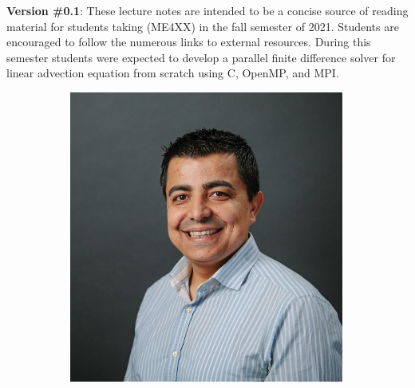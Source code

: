 {\bf Version \#0.1}: These lecture notes are intended to be a concise source of reading material for \school{} students taking \emph{\course{}} (ME4XX) in the fall semester of 2021. Students are encouraged to follow the numerous links to external resources. During this semester students were expected to develop a parallel finite difference solver for linear advection equation from scratch using C, OpenMP, and MPI.

\begin{figure}[h]
\begin{center}
 \begin{subfigure}{0.3\textwidth}
  \includegraphics[width=0.99\textwidth]{figures/cover/ali.jpg}
  \caption{}
 \end{subfigure}
 \begin{subfigure}{0.3\textwidth}

\end{subfigure}
\end{center}
\end{figure}
